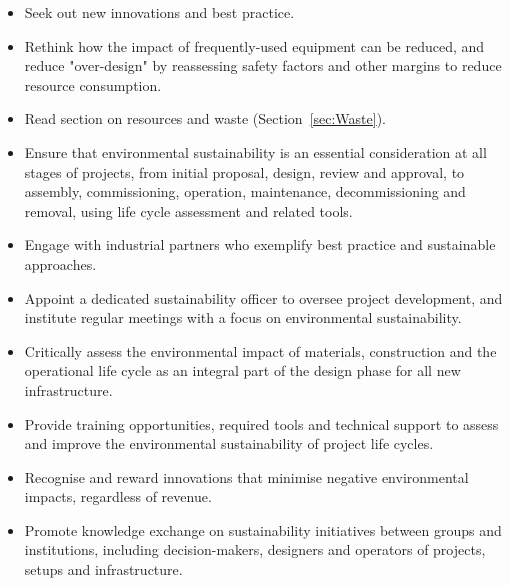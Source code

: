 \documentclass[../SustainableHEP.tex]{subfiles}
\begin{document}
\clearpage
\begin{reco2}{\currentname}
{
\begin{itemize}[leftmargin=6 mm]
\setlength{\itemsep}{\recskip}
\item Seek out new innovations and best practice.

\item Rethink how the impact of frequently-used equipment can be reduced, and reduce "over-design" by reassessing safety factors and other margins to reduce resource consumption.

\item Read section on resources and waste (Section~\ref{sec:Waste}).

\end{itemize}
}
{
\begin{itemize}[leftmargin=6 mm]
\setlength{\itemsep}{\recskip}
\item  Ensure that environmental sustainability is an essential consideration at all stages of projects, from initial proposal, design, review and approval, to assembly, commissioning, operation, maintenance, decommissioning and removal, using life cycle assessment and related tools.

\item Engage with industrial partners who exemplify best practice and sustainable approaches.

\item Appoint a dedicated sustainability officer to oversee project development, and institute regular meetings with a focus on environmental sustainability.

\end{itemize}
}
{
\begin{itemize}[leftmargin=6 mm]
\setlength{\itemsep}{\recskip}
\item Critically assess the environmental impact of materials, construction and the operational life cycle as an integral part of the design phase for all new infrastructure.

\item Provide training opportunities, required tools and technical support to assess and improve the environmental sustainability of project life cycles.

\item Recognise and reward innovations that minimise negative environmental impacts, regardless of revenue.

\item Promote knowledge exchange on sustainability initiatives between groups and institutions, including decision-makers, designers and operators of projects, setups and infrastructure.
\end{itemize}
}

\end{reco2}
\end{document}
